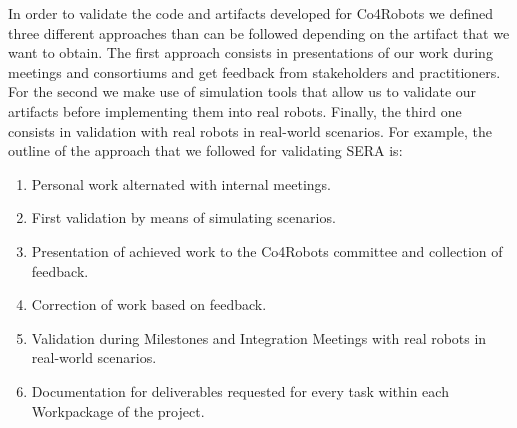 
In order to validate the code and artifacts developed for Co4Robots we defined three different approaches than can be followed depending on the artifact that we want to obtain.
The first approach consists in presentations of our work during meetings and consortiums and get feedback from stakeholders and practitioners.
For the second we make use of simulation tools that allow us to validate our artifacts before implementing them into real robots.
Finally, the third one consists in validation with real robots in real-world scenarios.
For example, the outline of the approach that we followed for validating SERA is:
\begin{enumerate}
\item Personal work alternated with internal meetings.
\item First validation by means of simulating scenarios.
\item Presentation of achieved work to the Co4Robots committee and collection of feedback.
\item Correction of work based on feedback.
\item Validation during Milestones and Integration Meetings with real robots in real-world scenarios.
\item Documentation for deliverables requested for every task within each Workpackage of the project.
\end{enumerate}



